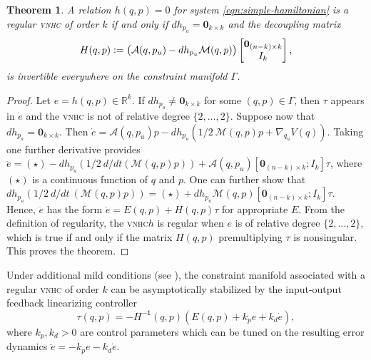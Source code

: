 \documentclass[journal,twoside,web, twocolumn]{ieeecolor}
\newtheorem{thm}{Theorem}%
\newcommand*{\inv}{^\mathsf{-1}}
\newcommand*{\R}{\mathbb{R}}
\newcommand*{\Id}[1]{I_{#1}}
\newcommand*{\Zmat}[1]{\bm{0}_{#1}}
\newcommand*{\simpleB}{\begin{bmatrix}\Zmat{(n-k)\times k}\\ \Id{k}\end{bmatrix}}
\newcommand*{\eqdef}{\vcentcolon=}
\newcommand*{\vnhc}{\textsc{vnhc}\xspace}
\begin{document}
\begin{thm}\label{thm:vnhc-regularity}
    A relation \(h(q,p) = 0\) for system \eqref{eqn:simple-hamiltonian}
    is a regular \vnhc of order \(k\) if and only if 
    \(dh_{p_a} = \Zmat{k \times k}\) 
    and the decoupling matrix
    \begin{equation}\label{eqn:decoupling-matrix}
        H(q,p) \eqdef \big(\mathcal{A}(q,p_u) - dh_{p_u}\mathcal{M}(q,p)\big)\simpleB
         ,
     \end{equation}
    is invertible everywhere on the constraint manifold \(\Gamma\).
\end{thm}
\begin{proof}
    Let \(e = h(q,p) \in \R^k\).
    If \(dh_{p_a} \neq \Zmat{k\times k}\) for some \((q,p) \in \Gamma\), 
    then \(\tau\) appears in \(\dot{e}\) and the \vnhc is not of relative degree
    \(\{2,\ldots,2\}\). Suppose now that \(dh_{p_a} = \Zmat{k\times k}\).
    Then 
    \(\dot{e} = \mathcal{A}(q,p_u)p - 
     dh_{p_u}\left(1/2~\mathcal{M}(q,p)p + \nabla_{q_u}V(q)\right)\).
    Taking one further derivative provides
    \( \ddot{e} = (\star) - 
        dh_{p_u}\left(1/2~d/dt\left(\mathcal{M}(q,p)p\right)\right) 
        + \mathcal{A}(q,p_u)[\Zmat{(n-k)\times k};\Id{k}] \tau\),
    where \((\star)\) is a continuous function of \(q\) and \(p\).
    One can further show that
    \(dh_{p_u}\left(1/2~d/dt~\left(\mathcal{M}(q,p)p\right)\right)
        = (\star) + dh_{p_u}\mathcal{M}(q,p)[\Zmat{(n-k)\times k};
        \Id{k}]\tau\).
    Hence, $\ddot e$ has the form \( \ddot{e} = E(q,p) + H(q,p)\tau\) for appropriate \(E\).
    From the definition of regularity, the \vnhc \(h\) is regular 
    when \(e\) is of relative degree \(\{2,\ldots,2\}\), which is true 
    if and only if the matrix $H(q,p)$ premultiplying \(\tau\) is nonsingular. This proves the theorem.
\end{proof}

Under additional mild conditions (see \cite{vhcs_for_el_systems}), the constraint manifold associated with a regular \vnhc of order \(k\) can be asymptotically stabilized by the input-output feedback linearizing controller
\begin{equation}\label{eqn:stabilizing-controller}
    \tau(q,p) = -H\inv(q,p)\left(E(q,p) + k_p e + k_d \dot{e}\right)
    ,
\end{equation}
where \(k_p, k_d > 0\) are control parameters which can be tuned on the
resulting error dynamics \(\ddot{e} = -k_p e - k_d \dot{e}\).
\end{document}
